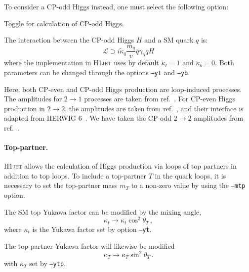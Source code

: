 \documentclass[12pt]{article}
\begin{document}
\noindent
To consider a CP-odd Higgs instead, one must select the following option: 
\begin{description}[labelindent=1cm, labelwidth =\widthof{\bfseries9999999999999999999999}, leftmargin = !] 
	\item[\texttt{--cpodd}] Toggle for calculation of CP-odd Higgs. 
\end{description}
The interaction between the CP-odd Higgs $H$ and a SM quark $q$ is: 
\begin{equation}
   \mathcal{L} \supset i \tilde{\kappa}_q \frac{m_q}{v} \bar{q} \gamma_5 q H
\end{equation}
where the implementation in \textsc{H1jet} uses by default $\tilde{\kappa}_t = 1$ and $\tilde{\kappa}_b = 0$. Both parameters can be changed through the options \texttt{--yt} and \texttt{--yb}.

Here, both CP-even and CP-odd Higgs production are loop-induced
processes. The amplitudes for $2\to 1$ processes are taken from
ref.~\cite{Spira:1995rr}. For CP-even Higgs production in $2\to 2$,
the amplitudes are taken from ref.~\cite{Baur:1989cm}, and their
interface is adapted from \textsc{HERWIG 6}~\cite{Corcella:2000bw}. We have taken the CP-odd $2\to 2$
amplitudes from ref.~\cite{Grojean:2013nya}.

\paragraph{Top-partner.} \textsc{H1jet} allows the calculation of
Higgs production via loops of top partners in addition to top loops.
To include a top-partner $T$ in the quark loops, it is necessary
to set the top-partner mass $m_T$ to a non-zero value by using the
\texttt{--mtp} option.

The SM top Yukawa factor can be modified by the mixing angle, 
\begin{equation}
   \kappa_t \rightarrow \kappa_t \cos^2\theta_T \,, 
\end{equation} 
where $\kappa_t$ is the Yukawa factor set by option \texttt{--yt}. 

The top-partner Yukawa factor will likewise be modified 
\begin{equation}
   \kappa_T \rightarrow \kappa_T \sin^2\theta_T \,. 
\end{equation} 
with $\kappa_T$ set by \texttt{--ytp}.
\end{document}

